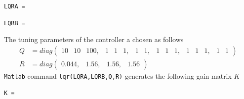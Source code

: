 \begin{lstlisting}
LQRA =

\end{lstlisting}
\begin{lstlisting}
LQRB =

\end{lstlisting}
The tuning parameters of the  controller a chosen as follows
\begin{equation}\label{key}
\begin{aligned}
Q &= diag\begin{pmatrix}
10 &10 &100,& 1& 1& 1, &1& 1,& 1& 1 &1,& 1& 1& 1,& 1& 1
\end{pmatrix}\\
R &= diag\begin{pmatrix}
0.044, &1.56,& 1.56, &1.56
\end{pmatrix}
\end{aligned}
\end{equation}
\texttt{Matlab} command \texttt{lqr(LQRA,LQRB,Q,R)} generates the following gain matrix $ K $
\begin{lstlisting}
K =

\end{lstlisting}




